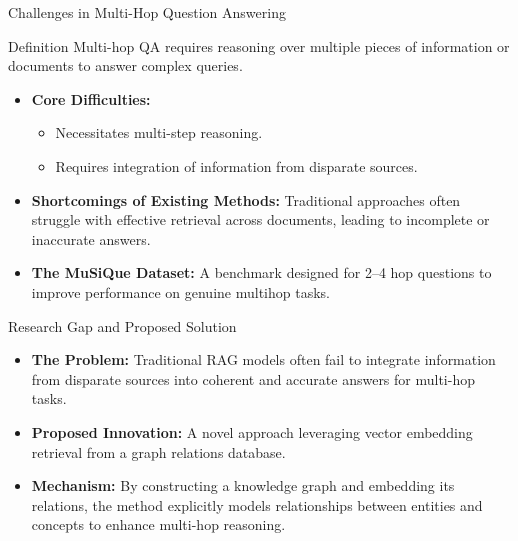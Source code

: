 \documentclass[aspectratio=169,xcolor=dvipsnames]{beamer}
\begin{document}
	\begin{frame}{Challenges in Multi-Hop Question Answering}
		
		\begin{block}{Definition}
			Multi-hop QA requires reasoning over multiple pieces of information
			or documents to answer complex queries.
		\end{block}
		
		\begin{itemize}
			\item \textbf{Core Difficulties:}
			\begin{itemize}
				\item Necessitates multi-step reasoning.
				\item Requires integration of information from disparate sources.
			\end{itemize}
			
			\item \textbf{Shortcomings of Existing Methods:}
			Traditional approaches often struggle with effective retrieval across documents,
			leading to incomplete or inaccurate answers.
			
			\item \textbf{The MuSiQue Dataset:}
			A benchmark designed for 2--4 hop questions to improve performance
			on genuine multihop tasks.
		\end{itemize}
		
	\end{frame}
	
	\begin{frame}{Research Gap and Proposed Solution}
		
		\begin{itemize}
			\item \textbf{The Problem:}
			Traditional RAG models often fail to integrate information from
			disparate sources into coherent and accurate answers for multi-hop tasks.
			
			\item \textbf{Proposed Innovation:}
			A novel approach leveraging vector embedding retrieval from a
			graph relations database. 	\alert{\cite{amiriShavaki2024kgRAGAVIR}}
			
			\item \textbf{Mechanism:}
			By constructing a knowledge graph and embedding its relations,
			the method explicitly models relationships between entities and
			concepts to enhance multi-hop reasoning.
		\end{itemize}
	\end{frame}
	
\end{document}
